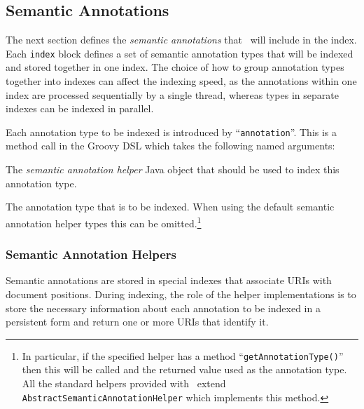 \subsection*{Semantic Annotations}\label{sec:indexing:helpers}

The next section defines the {\em semantic annotations} that \Mimir\ will
include in the index.  Each \lstinline!index! block defines a set of semantic
annotation types that will be indexed and stored together in one index.  The
choice of how to group annotation types together into indexes can affect the
indexing speed, as the annotations within one index are processed sequentially
by a single thread, whereas types in separate indexes can be indexed in
parallel.

Each annotation type to be indexed is introduced by ``{\tt annotation}''.  This
is a method call in the Groovy DSL which takes the following named arguments:
\bde
\item[helper] The {\em semantic annotation helper} Java object that should be
  used to index this annotation type.
\item[type] The annotation type that is to be indexed.  When using the default
  semantic annotation helper types this can be omitted.\footnote{In particular,
  if the specified helper has a method ``{\tt getAnnotationType()}'' then this
  will be called and the returned value used as the annotation type.  All the
  standard helpers provided with \Mimir\ extend
  {\tt AbstractSemanticAnnotationHelper} which implements this method.}
\ede

\subsubsection{Semantic Annotation Helpers}

Semantic annotations are stored in special indexes that associate URIs with
document positions. During indexing, the role of the helper implementations is 
to store the necessary information about each annotation to be indexed in a
persistent form and return one or more URIs that identify it.

